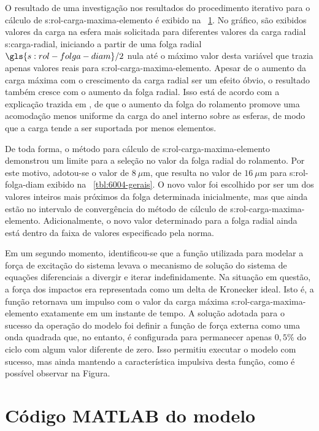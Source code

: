 \documentclass[12pt,oneside,english,brazil,lmodern,siglas,simbolos,cite=num]{ucsmonograph}
\begin{document}
	O resultado de uma investigação nos resultados do procedimento iterativo para o cálculo de \gls{s:rol-carga-maxima-elemento} é exibido na \figurename\ \ref{fig:modelo-converg-carga-max}.
	No gráfico, são exibidos valores da carga na esfera mais solicitada para diferentes valores da carga radial \gls{s:carga-radial}, iniciando a partir de uma folga radial $\gls{s:rol-folga-diam}/2$ nula até o máximo valor desta variável que trazia apenas valores reais para \gls{s:rol-carga-maxima-elemento}.
	Apesar de o aumento da carga máxima com o crescimento da carga radial ser um efeito óbvio, o resultado também cresce com o aumento da folga radial.
	Isso está de acordo com a explicação trazida em \cite{hamrock:1991}, de que o aumento da folga do rolamento promove uma acomodação menos uniforme da carga do anel interno sobre as esferas, de modo que a carga tende a ser suportada por menos elementos.
	
	\begin{figure}[b]
		\label{fig:modelo-converg-carga-max}
	\end{figure}

	De toda forma, o método para cálculo de \gls{s:rol-carga-maxima-elemento} demonstrou um limite para a seleção no valor da folga radial do rolamento. Por este motivo, adotou-se o valor de $8\ \mu\text{m}$, que resulta no valor de $16\ \mu\text{m}$ para \gls{s:rol-folga-diam} exibido na \tablename\ \ref{tbl:6004-gerais}.
	O novo valor foi escolhido por ser um dos valores inteiros mais próximos da folga determinada inicialmente, mas que ainda estão no intervalo de convergência do método de cálculo de \gls{s:rol-carga-maxima-elemento}.
	Adicionalmente, o novo valor determinado para a folga radial ainda está dentro da faixa de valores especificado pela norma.
	
	Em um segundo momento, identificou-se que a função utilizada para modelar a força de excitação do sistema levava o mecanismo de solução do sistema de equações diferenciais a divergir e iterar indefinidamente.
	Na situação em questão, a força dos impactos era representada como um delta de Kronecker ideal.
	Isto é, a função retornava um impulso com o valor da carga máxima \gls{s:rol-carga-maxima-elemento} exatamente em um instante de tempo.
	A solução adotada para o sucesso da operação do modelo foi definir a função de força externa como uma onda quadrada que, no entanto, é configurada para permanecer apenas $0,5\%$ do ciclo com algum valor diferente de zero.
	Isso permitiu executar o modelo com sucesso, mas ainda mantendo a característica impulsiva desta função, como é possível observar na Figura.
	
	\postextual
	
	
	
	\apendices
	\chapter{Código MATLAB do modelo} \label{apc:codigo}
	
	
\end{document}
